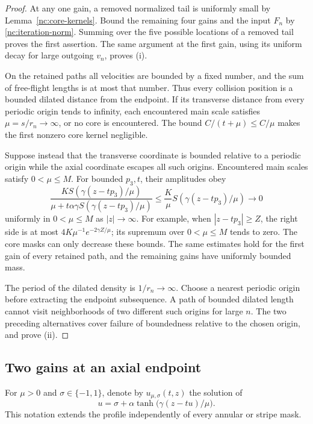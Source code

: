 \begin{proof}
At any one gain, a removed normalized tail is uniformly small by
Lemma~\ref{nc:core-kernels}.  Bound the remaining four gains and the
input \(F_n\) by \eqref{nc:iteration-norm}.  Summing over the five
possible locations of a removed tail proves the first assertion.
The same argument at the first gain, using its uniform decay for
large outgoing \(v_n\), proves (i).

On the retained paths all velocities are bounded by a fixed number,
and the sum of free-flight lengths is at most that number.  Thus
every collision position is a bounded dilated distance from the
endpoint.  If its transverse distance from every periodic origin
tends to infinity, each encountered main scale satisfies
\(\mu=s/r_n\to\infty\), or no core is encountered.  The bound
\(C/(t+\mu)\le C/\mu\) makes the first nonzero core kernel negligible.

Suppose instead that the transverse coordinate is bounded relative
to a periodic origin while the axial coordinate escapes all such
origins.  Encountered main scales satisfy \(0<\mu\le M\).  For
bounded \(p_3,t\), their amplitudes obey
\begin{equation}
\label{nc:axial-escape}
 \frac{K S(\gamma(z-tp_3)/\mu)}
      {\mu+t\alpha\gamma S(\gamma(z-tp_3)/\mu)}
 \le \frac K\mu S(\gamma(z-tp_3)/\mu)\longrightarrow0
\end{equation}
uniformly in \(0<\mu\le M\) as \(|z|\to\infty\).
For example, when \(|z-tp_3|\ge Z\),
the right side is at most \(4K\mu^{-1}e^{-2\gamma Z/\mu}\);
its supremum over \(0<\mu\le M\) tends to zero.
The core masks can only decrease these bounds.  The same estimates
hold for the first gain of every retained path, and the remaining
gains have uniformly bounded mass.

The period of the dilated density is \(1/r_n\to\infty\).
Choose a nearest periodic origin before extracting the endpoint
subsequence.  A path of bounded dilated length cannot visit
neighborhoods of two different such origins for large \(n\).
The two preceding alternatives cover failure of boundedness
relative to the chosen origin, and prove (ii).
\end{proof}

\subsection{Two gains at an axial endpoint}

For \(\mu>0\) and \(\sigma\in\{-1,1\}\), denote by
\(u_{\mu,\sigma}(t,z)\) the solution of
\[
 u=\sigma+\alpha\tanh\bigl(\gamma(z-tu)/\mu\bigr).
\]
This notation extends the profile independently of every annular
or stripe mask.

